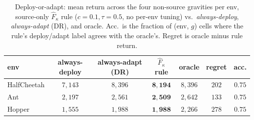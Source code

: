 \documentclass{article}
\begin{document}
\begin{table}[h]
\centering\small
\caption{Deploy-or-adapt: mean return across the four non-source gravities per env, source-only $\hat F_\kappa$ rule ($c{=}0.1, \tau{=}0.5$, no per-env tuning) vs.\ \emph{always-deploy}, \emph{always-adapt} (DR), and oracle. Acc.\ is the fraction of (env, $g$) cells where the rule's deploy/adapt label agrees with the oracle's. Regret is oracle minus rule return.}
\label{tab:deploy-or-adapt}
\begin{tabular}{lcccccc}
\toprule
env & always-deploy & always-adapt (DR) & $\hat F_\kappa$ rule & oracle & regret & acc. \\
\midrule
HalfCheetah & $7{,}143$ & $8{,}396$ & $\mathbf{8{,}194}$ & $8{,}396$ & $202$ & $0.75$ \\
Ant         & $2{,}197$ & $2{,}561$ & $\mathbf{2{,}509}$ & $2{,}642$ & $133$ & $0.75$ \\
Hopper      & $1{,}555$ & $1{,}988$ & $\mathbf{1{,}988}$ & $2{,}266$ & $278$ & $0.75$ \\
\bottomrule
\end{tabular}
\end{table}
\end{document}
